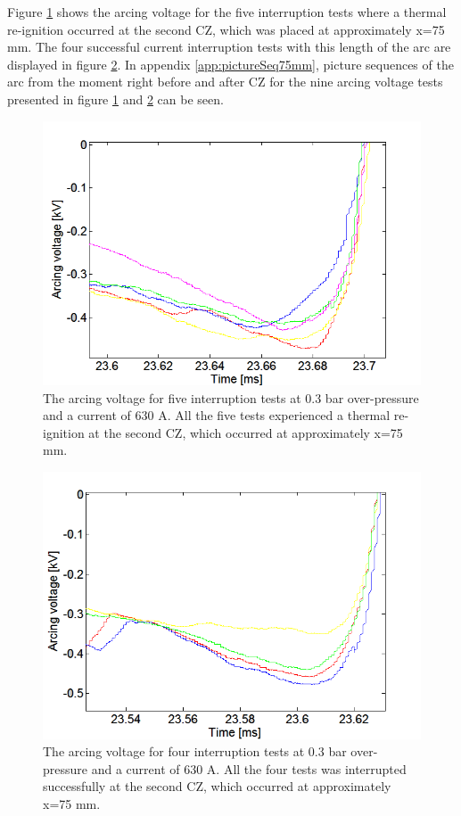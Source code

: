 \documentclass[10pt,b5paper,twoside]{article}
\begin{document}
Figure \ref{fig:75mmUnSuccessful} shows the arcing voltage for the five interruption tests where a thermal re-ignition occurred at the second CZ, which was placed at approximately x=75 mm. The four successful current interruption tests with this length of the arc are displayed in figure \ref{fig:75mmSuccessful}. In appendix \ref{app:pictureSeq75mm}, picture sequences of the arc from the moment right before and after CZ for the nine arcing voltage tests presented in figure \ref{fig:75mmUnSuccessful} and \ref{fig:75mmSuccessful} can be seen.

\begin{figure}[H]
\centering
\includegraphics[scale=0.6, angle =0 ]{Bilder/Results/ArcingVoltage_75_reIgnition.PNG}
\caption{The arcing voltage for five interruption tests at 0.3 bar over-pressure and a current of 630 A. All the five tests experienced a thermal re-ignition at the second CZ, which occurred at approximately  x=75 mm.} \label{fig:75mmUnSuccessful}
\end{figure}

\begin{figure}[H]
\centering
\includegraphics[scale=0.6, angle =0 ]{Bilder/Results/ArcingVoltage_75_none_reIgnition.PNG}
\caption{The arcing voltage for four interruption tests at 0.3 bar over-pressure and a current of 630 A. All the four tests was interrupted successfully at the second CZ, which occurred at approximately  x=75 mm.} \label{fig:75mmSuccessful}
\end{figure}
\end{document}
